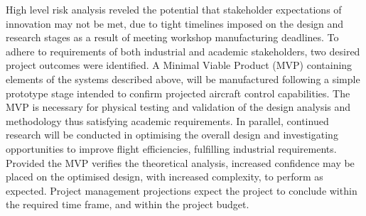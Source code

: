 High level risk analysis reveled the potential that stakeholder expectations of innovation may not be met, due to tight timelines imposed on the design and research stages as a result of meeting workshop manufacturing deadlines. To adhere to requirements of both industrial and academic stakeholders, two desired project outcomes were identified. A Minimal Viable Product (MVP) containing elements of the systems described above, will be manufactured following a simple prototype stage intended to confirm projected aircraft control capabilities. The MVP is necessary for physical testing and validation of the design analysis and methodology thus satisfying academic requirements. In parallel, continued research will be conducted in optimising the overall design and investigating opportunities to improve flight efficiencies, fulfilling industrial requirements. Provided the MVP verifies the theoretical analysis, increased confidence may be placed on the optimised design, with increased complexity, to perform as expected. Project management projections expect the project to conclude within the required time frame, and within the project budget. 
